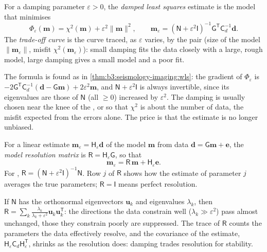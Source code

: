 \begin{definition}\label{def:b3:seismology-imaging:damped}
For a damping parameter $\varepsilon > 0$, the \emph{damped least
squares} estimate is the model that minimises
\[
  \Phi_\varepsilon(\mathbf m) = \chi^2(\mathbf m) + \varepsilon^2\|\mathbf m\|^2 ,
  \qquad
  \mathbf m_\varepsilon = \left(\mathsf N + \varepsilon^2\mathsf I\right)^{-1}
  \mathsf G^{\mathsf T}\mathsf C_d^{-1}\mathbf d .
\]
The \emph{trade-off curve} is the curve traced, as
$\varepsilon$ varies, by the pair (size of the model $\|\mathbf m_\varepsilon\|$,
misfit $\chi^2(\mathbf m_\varepsilon)$): small damping fits the data closely
with a large, rough model, large damping gives a small model and a poor fit.
\end{definition}

The formula is found as in \cref{thm:b3:seismology-imaging:wls}: the gradient
of $\Phi_\varepsilon$ is $-2\mathsf G^{\mathsf T}\mathsf C_d^{-1}(\mathbf d -
\mathsf G\mathbf m) + 2\varepsilon^2\mathbf m$, and $\mathsf N + \varepsilon^2
\mathsf I$ is always invertible, since its eigenvalues are those of
$\mathsf N$ (all $\ge 0$) increased by $\varepsilon^2$. The damping is usually
chosen near the knee of the , or so that $\chi^2$ is about the
number of data, the misfit expected from the errors alone. The price is that the
estimate is no longer unbiased.

\begin{definition}\label{def:b3:seismology-imaging:resolution}
For a linear estimate $\mathbf m_\varepsilon = \mathsf H_\varepsilon \mathbf d$
of the model $\mathbf m$ from data $\mathbf d = \mathsf G\mathbf m + \mathbf e$,
the \emph{model resolution matrix} is
$\mathsf R = \mathsf H_\varepsilon\mathsf G$, so that
\[
  \mathbf m_\varepsilon = \mathsf R\,\mathbf m + \mathsf H_\varepsilon\mathbf e .
\]
For , $\mathsf R = (\mathsf N + \varepsilon^2\mathsf I)^{-1}
\mathsf N$. Row $j$ of $\mathsf R$ shows how the estimate of parameter $j$
averages the true parameters; $\mathsf R = \mathsf I$ means perfect resolution.
\end{definition}

If $\mathsf N$ has the orthonormal eigenvectors $\mathbf u_k$ and eigenvalues
$\lambda_k$, then $\mathsf R = \sum_k \frac{\lambda_k}{\lambda_k + \varepsilon^2}
\mathbf u_k\mathbf u_k^{\mathsf T}$: the directions the data constrain well
($\lambda_k \gg \varepsilon^2$) pass almost unchanged, those they constrain
poorly are suppressed. The trace of $\mathsf R$ counts the parameters the data
effectively resolve, and the covariance of the estimate,
$\mathsf H_\varepsilon\mathsf C_d\mathsf H_\varepsilon^{\mathsf T}$, shrinks as
the resolution does: damping trades resolution for stability.


